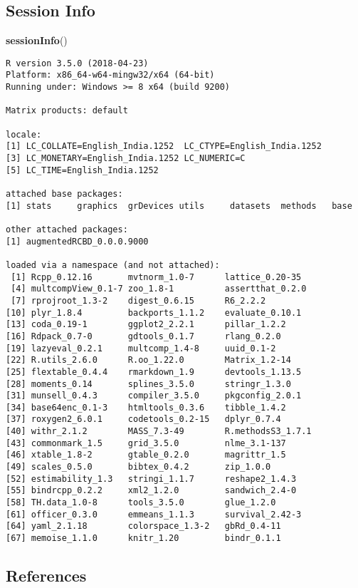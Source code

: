 \documentclass[]{article}
\newenvironment{Shaded}{\begin{snugshade}}{\end{snugshade}}
\newcommand{\KeywordTok}[1]{\textcolor[rgb]{0.13,0.29,0.53}{\textbf{#1}}}
\newcommand{\NormalTok}[1]{#1}
\begin{document}
\hypertarget{session-info}{%
\subsection{Session Info}\label{session-info}}

\begin{Shaded}
\begin{Highlighting}[]
\KeywordTok{sessionInfo}\NormalTok{()}
\end{Highlighting}
\end{Shaded}

\begin{verbatim}
R version 3.5.0 (2018-04-23)
Platform: x86_64-w64-mingw32/x64 (64-bit)
Running under: Windows >= 8 x64 (build 9200)

Matrix products: default

locale:
[1] LC_COLLATE=English_India.1252  LC_CTYPE=English_India.1252   
[3] LC_MONETARY=English_India.1252 LC_NUMERIC=C                  
[5] LC_TIME=English_India.1252    

attached base packages:
[1] stats     graphics  grDevices utils     datasets  methods   base     

other attached packages:
[1] augmentedRCBD_0.0.0.9000

loaded via a namespace (and not attached):
 [1] Rcpp_0.12.16       mvtnorm_1.0-7      lattice_0.20-35   
 [4] multcompView_0.1-7 zoo_1.8-1          assertthat_0.2.0  
 [7] rprojroot_1.3-2    digest_0.6.15      R6_2.2.2          
[10] plyr_1.8.4         backports_1.1.2    evaluate_0.10.1   
[13] coda_0.19-1        ggplot2_2.2.1      pillar_1.2.2      
[16] Rdpack_0.7-0       gdtools_0.1.7      rlang_0.2.0       
[19] lazyeval_0.2.1     multcomp_1.4-8     uuid_0.1-2        
[22] R.utils_2.6.0      R.oo_1.22.0        Matrix_1.2-14     
[25] flextable_0.4.4    rmarkdown_1.9      devtools_1.13.5   
[28] moments_0.14       splines_3.5.0      stringr_1.3.0     
[31] munsell_0.4.3      compiler_3.5.0     pkgconfig_2.0.1   
[34] base64enc_0.1-3    htmltools_0.3.6    tibble_1.4.2      
[37] roxygen2_6.0.1     codetools_0.2-15   dplyr_0.7.4       
[40] withr_2.1.2        MASS_7.3-49        R.methodsS3_1.7.1 
[43] commonmark_1.5     grid_3.5.0         nlme_3.1-137      
[46] xtable_1.8-2       gtable_0.2.0       magrittr_1.5      
[49] scales_0.5.0       bibtex_0.4.2       zip_1.0.0         
[52] estimability_1.3   stringi_1.1.7      reshape2_1.4.3    
[55] bindrcpp_0.2.2     xml2_1.2.0         sandwich_2.4-0    
[58] TH.data_1.0-8      tools_3.5.0        glue_1.2.0        
[61] officer_0.3.0      emmeans_1.1.3      survival_2.42-3   
[64] yaml_2.1.18        colorspace_1.3-2   gbRd_0.4-11       
[67] memoise_1.1.0      knitr_1.20         bindr_0.1.1       
\end{verbatim}

\hypertarget{references}{%
\subsection{References}\label{references}}
\end{document}
